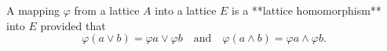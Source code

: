A mapping $\varphi$ from a lattice $A$ into a lattice $E$ is a **lattice homomorphism** into $E$ provided that
$$\varphi(a \vee b) = \varphi a \vee \varphi b \quad \text{and} \quad \varphi(a \wedge b) = \varphi a \wedge \varphi b.$$
